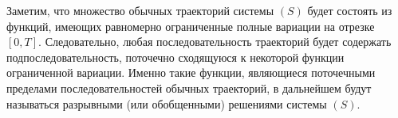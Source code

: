 Заметим, что множество обычных траекторий системы $(S)$ будет состоять
из функций, имеющих равномерно ограниченные полные вариации на отрезке
$[0,T]$. Следовательно, любая последовательность траекторий будет
содержать подпоследовательность, поточечно сходящуюся к некоторой
функции ограниченной вариации. Именно такие функции, являющиеся
поточечными пределами последовательностей обычных траекторий, в
дальнейшем будут называться разрывными (или обобщенными) решениями
системы $(S)$.






